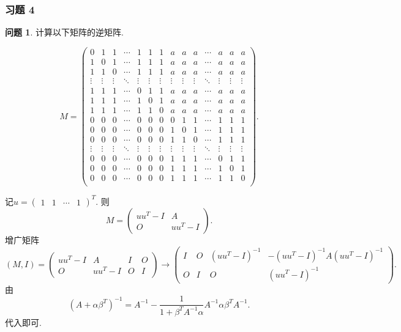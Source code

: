 \documentclass[11pt]{ctexart}
\theoremstyle{definition}
\newtheorem{qqq}{问题}[section]
\numberwithin{equation}{section}
\begin{document}
\subsubsection{习题 4}
\begin{qqq}
    计算以下矩阵的逆矩阵.
        \addtocounter{MaxMatrixCols}{15}
        \begin{equation}
            M=\begin{pmatrix}
                0&1&1&\cdots&1&1&1&a&a&a&\cdots&a&a&a\\
                1&0&1&\cdots&1&1&1&a&a&a&\cdots&a&a&a\\
                1&1&0&\cdots&1&1&1&a&a&a&\cdots&a&a&a\\
                \vdots&\vdots&\vdots&\ddots&\vdots&\vdots&\vdots&\vdots&\vdots&\vdots&\ddots&\vdots&\vdots&\vdots\\
                1&1&1&\cdots&0&1&1&a&a&a&\cdots&a&a&a\\
                1&1&1&\cdots&1&0&1&a&a&a&\cdots&a&a&a\\
                1&1&1&\cdots&1&1&0&a&a&a&\cdots&a&a&a\\
                0&0&0&\cdots&0&0&0&0&1&1&\cdots&1&1&1\\
                0&0&0&\cdots&0&0&0&1&0&1&\cdots&1&1&1\\
                0&0&0&\cdots&0&0&0&1&1&0&\cdots&1&1&1\\
                \vdots&\vdots&\vdots&\ddots&\vdots&\vdots&\vdots&\vdots&\vdots&\vdots&\ddots&\vdots&\vdots&\vdots\\
                0&0&0&\cdots&0&0&0&1&1&1&\cdots&0&1&1\\
                0&0&0&\cdots&0&0&0&1&1&1&\cdots&1&0&1\\
                0&0&0&\cdots&0&0&0&1&1&1&\cdots&1&1&0\\
            \end{pmatrix}.
        \end{equation}
\end{qqq}
\begin{aaa}
    记$u=\begin{pmatrix}
        1&1&\cdots&1
    \end{pmatrix}^T$.
    则\[M=\begin{pmatrix}
        uu^T-I&A\\O&uu^T-I
    \end{pmatrix}.\]
    增广矩阵$(M,I)=\begin{pmatrix}
        uu^T-I&A&I&O\\O&uu^T-I&O&I
    \end{pmatrix}\longrightarrow \begin{pmatrix}
        I&O&(uu^T-I)^{-1}&-(uu^T-I)^{-1}A(uu^T-I)^{-1}\\O&I&O&(uu^T-I)^{-1}
    \end{pmatrix}.$
    由\[(A+\alpha\beta^T)^{-1}=A^{-1}-\frac{1}{1+\beta^TA^{-1}\alpha}A^{-1}\alpha\beta^TA^{-1}.\]
    代入即可.
\end{aaa}
\end{document}
